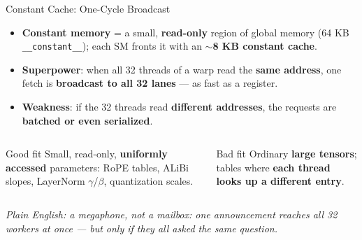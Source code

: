 \documentclass[aspectratio=169]{beamer}
\newcommand{\kw}[1]{\textbf{\textcolor{kwblue}{#1}}}
\newcommand{\pe}[1]{\par{\setlength{\fboxsep}{2.5pt}\noindent\colorbox{navy!9}{\parbox{\dimexpr\textwidth-5pt\relax}{\footnotesize\itshape Plain English: #1}}}}
\begin{document}
\begin{frame}{Constant Cache: One-Cycle Broadcast}
  \begin{itemize}
    \item \kw{Constant memory} = a small, \kw{read-only} region of global memory
          (64 KB \texttt{\_\_constant\_\_}); each SM fronts it with an
          $\sim$\kw{8 KB constant cache}.
    \item \kw{Superpower}: when all 32 threads of a warp read the \kw{same address},
          one fetch is \kw{broadcast to all 32 lanes} --- as fast as a register.
    \item \kw{Weakness}: if the 32 threads read \kw{different addresses},
          the requests are \kw{batched or even serialized}.
  \end{itemize}
  \medskip
  \begin{columns}[t]
    \begin{exampleblock}{Good fit}
      \small Small, read-only, \kw{uniformly accessed} parameters:
      RoPE tables, ALiBi slopes, LayerNorm $\gamma$/$\beta$, quantization scales.
    \end{exampleblock}
    \begin{block}{Bad fit}
      \small Ordinary \kw{large tensors}; tables where \kw{each thread looks up
      a different entry}.
    \end{block}
  \end{columns}
  \pe{a megaphone, not a mailbox: one announcement reaches all 32 workers at once --- but only if they all asked the same question.}
\end{frame}
\end{document}
